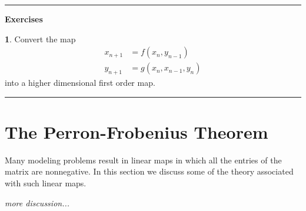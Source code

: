 \documentclass[reqno]{immbook}
\numberwithin{equation}{chapter}
\numberwithin{question}{section}
\numberwithin{theorem}{chapter}
\numberwithin{figure}{chapter}
\theoremstyle{definition}
\newtheorem{exercise}{}[section]
\newenvironment{exercises}%
{%
\medskip\hrule\medskip\noindent\textbf{Exercises}%
}%
{%
\medskip\hrule
}
\begin{document}
\begin{exercises}
\begin{exercise}
Convert the map
\begin{equation}
\begin{split}
   x_{n+1} & = f(x_n,y_{n-1}) \\
   y_{n+1} & = g(x_n,x_{n-1},y_{n})
\end{split}
\end{equation}
into a higher dimensional first order map.
\end{exercise}
\end{exercises}

\section{The Perron-Frobenius Theorem}
Many modeling problems result in linear maps
in which all the entries of the matrix
are nonnegative.
In this section we discuss some of the theory
associated with such linear maps.

\emph{more discussion...}
\end{document}
